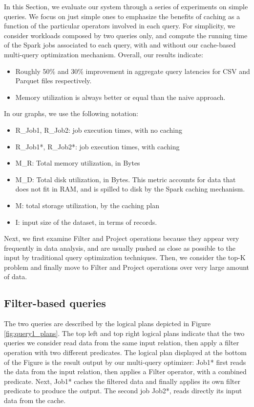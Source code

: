 In this Section, we evaluate our system through a series of experiments on simple queries. We focus on just simple ones to emphasize the benefits of caching as a function of the particular operators involved in each query. For simplicity, we consider workloads composed by two queries only, and compute the running time of the Spark jobs associated to each query, with and without our cache-based multi-query optimization mechanism. Overall, our results indicate:

\begin{itemize}
	\item Roughly 50\% and 30\% improvement in aggregate query latencies for CSV and Parquet files respectively.
	\item Memory utilization is always better or equal than the naive approach.
\end{itemize}

In our graphs, we use the following notation:
\begin{itemize}
	\item R\_Job1, R\_Job2: job execution times, with no caching
	\item R\_Job1*, R\_Job2*: job execution times, with caching
	\item M\_R: Total memory utilization, in Bytes
	\item M\_D: Total disk utilization, in Bytes. This metric accounts for data that does not fit in RAM, and is spilled to disk by the Spark caching mechanism.
	\item M: total storage utilization, by the caching plan
	\item I: input size of the dataset, in terms of records.
\end{itemize}

Next, we first examine Filter and Project operations because they appear very frequently in data analysis, and are usually pushed as close as possible to the input by traditional query optimization techniques. Then, we consider the top-K problem and finally move to Filter and Project operations over very large amount of data.

\subsection{Filter-based queries}
The two queries are described by the logical plans depicted in Figure \ref{fig:query1_plans}. The top left and top right logical plans indicate that the two queries we consider read data from the same input relation, then apply a filter operation with two different predicates. The logical plan displayed at the bottom of the Figure is the result output by our multi-query optimizer: Job1* first reads the data from the input relation, then applies a Filter operator, with a combined predicate. Next, Job1* caches the filtered data and finally applies its own filter predicate to produce the output. The second job Job2*, reads directly its input data from the cache.

